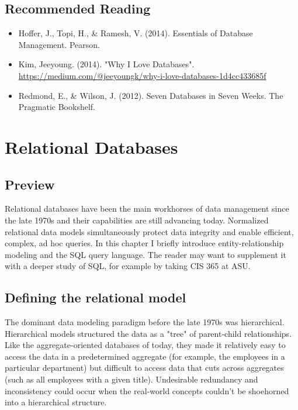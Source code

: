 \documentclass[11pt]{book}
\begin{document}
\section*{Recommended Reading}
\begin{itemize}
    \item Hoffer, J., Topi, H., \& Ramesh, V. (2014). Essentials of Database Management. Pearson.
    \item Kim, Jeeyoung. (2014). "Why I Love Databases". \url{https://medium.com/@jeeyoungk/why-i-love-databases-1d4cc433685f}
    \item Redmond, E., \& Wilson, J. (2012). Seven Databases in Seven Weeks.  The Pragmatic Bookshelf.
\end{itemize}









\chapter{Relational Databases}\label{ch:sql}

\section*{Preview}

Relational databases have been the main workhorses of data management since the late 1970s and their capabilities are still advancing today.  Normalized relational data models simultaneously protect data integrity and enable efficient, complex, ad hoc queries.  In this chapter I briefly introduce entity-relationship modeling and the SQL query language.  The reader may want to supplement it with a deeper study of SQL, for example by taking CIS 365 at ASU.


\section{Defining the relational model}
The dominant data modeling paradigm before the late 1970s was hierarchical.  Hierarchical models structured the data as a "tree" of parent-child relationships.  Like the aggregate-oriented databases of today, they made it relatively easy to access the data in a predetermined aggregate (for example, the employees in a particular department) but difficult to access data that cuts across aggregates (such as all employees with a given title).  Undesirable redundancy and inconsistency could occur when the real-world concepts couldn't be shoehorned into a hierarchical structure.
\end{document}
